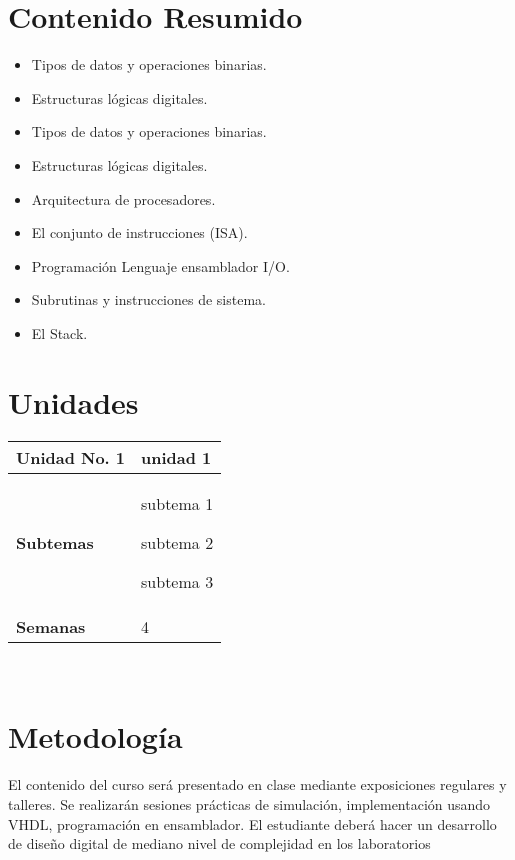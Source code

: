 \documentclass[11pt]{article}
\begin{document}
\section*{Contenido Resumido}

\begin{itemize}
\item Tipos de datos y operaciones binarias. \item Estructuras lógicas digitales. \item Tipos de datos y operaciones binarias. \item Estructuras lógicas digitales. \item Arquitectura de procesadores. \item El conjunto de instrucciones (ISA). \item Programación Lenguaje ensamblador I/O. \item Subrutinas y instrucciones de sistema. \item El Stack.
\end{itemize}

\section*{Unidades}
\noindent 
\begin{tabular}{R{0.16\textwidth} L{0.7\textwidth}} 
 \\ 
\toprule \textbf{Unidad No. 1} & unidad 1  
 \\ 
\midrule\textbf{Subtemas} & 
\begin{description}
\item subtema 1 \item subtema 2 \item subtema 3 
\end{description}
 \\ 
\textbf{Semanas} & 4 
\end{tabular} 
 \\ 


\section*{Metodología}

El contenido del curso será presentado en clase mediante exposiciones regulares y talleres. Se realizarán sesiones prácticas de simulación, implementación usando VHDL, programación en ensamblador. El estudiante deberá hacer un desarrollo de diseño digital de mediano nivel de complejidad en los laboratorios
\end{document}
